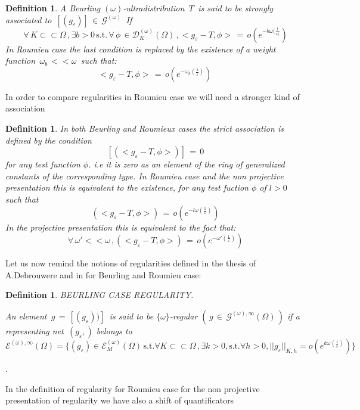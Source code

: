 \documentclass[12pt,a4paper]{amsart}
\newtheorem{definition}[theorem]{Definition}
\begin{document}
 \begin{definition}       
A  Beurling $(\omega)$-ultradistribution $\,T\,$ is said to be strongly associated to 
$\,[(g_\varepsilon)]\,\in\,\mathcal{G}^{(\omega)}\,$
If 
$$\,\forall\,K\subset\subset \Omega\,,\exists b>0\,
\mbox{s.t.} \,\forall \,\phi\,\in
 \mathcal{D}_K^{(\omega)}(\Omega)\,,
 <g_\varepsilon -T,\phi>\,=\,o(e^{-b\omega(\frac{1}{\varepsilon)}})\,$$
 In Roumieu case the last condition is replaced by the existence of a weight function $\,\omega_b\,<<\omega\,$
  such that: 
   $$ <g_\varepsilon -T,\phi>\,=\,o(e^{-\omega_b(\frac{1}{\varepsilon})})\,$$
   \end{definition}
  
  In order to compare regularities in Roumieu case we will need a stronger kind of association
  \begin{definition}
In both Beurling and Roumieux cases the strict association
is defined by the condition 
$$ [(<g_\varepsilon-T,\phi>)]\,=\,0$$ for any test function $\phi$.
i.e it is zero as an element of the ring of generalized constants of the corresponding type.
  In Roumieu case and the non projective presentation this is equivalent to the existence, for any test fuction $\phi$ of $l>0$ such that 
$$\,(<g_\varepsilon-T,\phi>)\,
=\,o(e^{-l\omega(\frac{1}{\varepsilon})})\,$$
In the projective presentation this is equivalent to the fact that: 
$$\,\forall\,\omega'<<\omega\,,(<g_\varepsilon-T,\phi>)\,
=\,o(e^{-\omega'(\frac{1}{\varepsilon})})\,$$

\end{definition}

Let us now remind the notions of regularities defined in the thesis of A.Debrouwere and in \cite{D.V.V.}
 for Beurling and Roumieu case:

\begin{definition}
BEURLING CASE REGULARITY.


An element $\,g\,=\,[(g_\varepsilon))]\,$
 is said to be $\{\omega\}$-regular 
 $(\,g\,\in\,\mathcal{G}^{(\omega),\infty}(\Omega)\,)$
 if a representing net $\,(g_\varepsilon,)$ belongs 
  to 
 $$\mathcal{E}^{(\omega),\infty}(\Omega) =
  \{(g_{\varepsilon}) \in \mathcal{E}^{(\omega)}_M (\Omega)  \, \mbox{s.t.} \forall K \subset \subset \Omega \,,
  \exists k>0 , \mbox{s.t.}
\forall h>0,||g_{\varepsilon}||_ {K,h} = o(e^{k\omega(\frac{1}{\varepsilon})} ) \} $$ 
\end{definition}.

In the definition of regularity for Roumieu case
for the non projective presentation of regularity we have also a shift of quantificators
 
\end{document}
